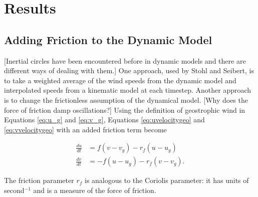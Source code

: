 \chapter{Results}

\section{Adding Friction to the Dynamic Model}

[Inertial circles have been encountered before in dynamic models and there are different ways of dealing with them.] \cite{stohl_accuracy_1998}
One approach, used by Stohl and Seibert, is to take a weighted average of the wind speeds from the dynamic model and interpolated speeds from a kinematic model at each timestep.
Another approach is to change the frictionless assumption of the dynamical model.
[Why does the force of friction damp oscillations?]
Using the definition of geostrophic wind in Equations \ref{eq:u_g} and \ref{eq:v_g}, Equations \ref{eq:uvelocitygeo} and \ref{eq:vvelocitygeo} with an added friction term become

\begin{align}
    \frac{du}{dt} &= f (v - v_g) - r_f (u - u_g) \\
    \frac{dv}{dt} &= -f (u - u_g) - r_f (v - v_g).   
\end{align}

The friction parameter $r_f$ is analogous to the Coriolis parameter: it has units of second$^{-1}$ and is a measure of the force of friction.
